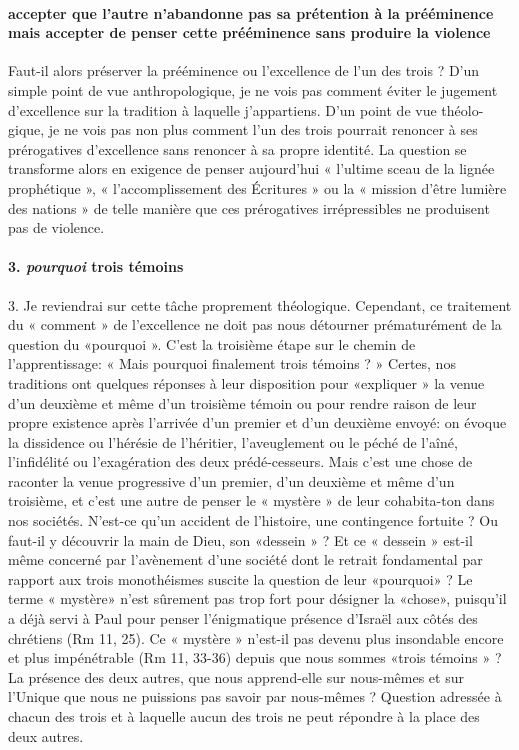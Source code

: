 \paragraph{accepter que l'autre n'abandonne pas sa prétention à la prééminence mais accepter de penser cette prééminence sans produire la violence}Faut-il alors préserver la prééminence ou l'excellence de l'un des trois ? D'un simple point de vue anthropologique, je ne vois pas comment éviter le jugement d'excellence sur la tradition à laquelle j'appartiens. D'un point de vue théolo-gique, je ne vois pas non plus comment l'un des trois pourrait renoncer à ses prérogatives d'excellence sans renoncer à sa propre identité. La question se transforme alors en exigence de penser aujourd'hui « l'ultime sceau de la lignée prophétique », « l'accomplissement des Écritures » ou la « mission d'être lumière des nations » de telle manière que ces prérogatives irrépressibles ne produisent pas de violence.

\paragraph{3. \textit{pourquoi} trois témoins}
3. Je reviendrai sur cette tâche proprement théologique.
Cependant, ce traitement du « comment » de l'excellence ne doit pas nous détourner prématurément de la question du «pourquoi ». C'est la troisième étape sur le chemin de l'apprentissage: « Mais pourquoi finalement trois témoins ? » Certes, nos traditions ont quelques réponses à leur disposition pour «expliquer » la venue d'un deuxième et même d'un troisième témoin ou pour rendre raison de leur propre existence après l'arrivée d'un premier et d'un deuxième envoyé: on évoque la dissidence ou l'hérésie de l'héritier, l'aveuglement ou le péché de l'aîné, l'infidélité ou l'exagération des deux prédé-cesseurs.   Mais c'est une chose de raconter la venue progressive d'un premier, d'un deuxième et même d'un troisième, et c'est une autre de penser le « mystère » de leur cohabita-ton dans nos sociétés. N'est-ce qu'un accident de l'histoire, une contingence fortuite ? Ou faut-il y découvrir la main de Dieu, son «dessein » ? Et ce « dessein » est-il même concerné par l'avènement d'une société dont le retrait fondamental par rapport aux trois monothéismes suscite la question de leur «pourquoi» ? Le terme « mystère» n'est sûrement pas trop fort pour désigner la «chose», puisqu'il a déjà servi à Paul pour penser l'énigmatique présence d'Israël aux côtés des chrétiens (Rm 11, 25). Ce « mystère » n'est-il pas devenu plus insondable encore et plus impénétrable (Rm 11, 33-36) depuis que nous sommes «trois témoins » ? La présence des deux autres, que nous apprend-elle sur nous-mêmes et sur l'Unique 
que nous ne puissions pas savoir par nous-mêmes ? Question adressée à chacun des trois et à laquelle aucun des trois ne peut répondre à la place des deux autres. 
